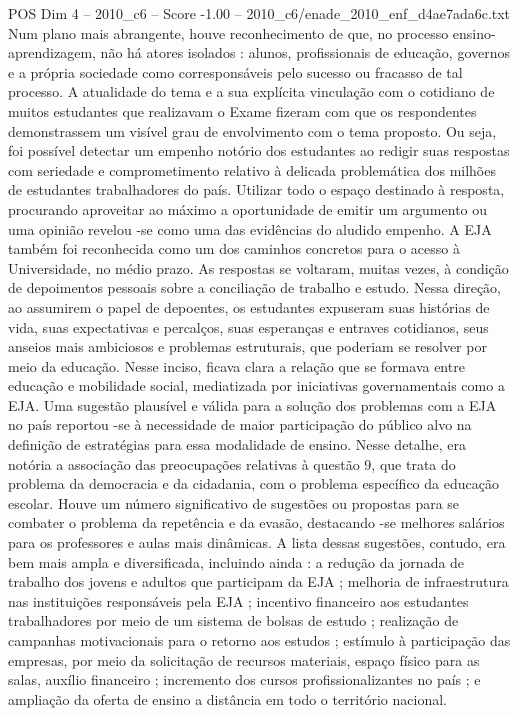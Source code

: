 \begin{textsample}{POS Dim 4 – 2010\_c6 – Score -1.00 – 2010\_c6/enade\_2010\_enf\_d4ae7ada6c.txt}
Num plano mais abrangente, houve reconhecimento de que, no processo ensino-aprendizagem, não há atores isolados : alunos, profissionais de educação, governos e a própria sociedade como corresponsáveis pelo sucesso ou fracasso de tal processo.
A atualidade do tema e a sua explícita vinculação com o cotidiano de muitos estudantes que realizavam o Exame fizeram com que os respondentes demonstrassem um visível grau de envolvimento com o tema proposto.
Ou seja, foi possível detectar um empenho notório dos estudantes ao redigir suas respostas com seriedade e comprometimento relativo à delicada problemática dos milhões de estudantes trabalhadores do país.
Utilizar todo o espaço destinado à resposta, procurando aproveitar ao máximo a oportunidade de emitir um argumento ou uma opinião revelou -se como uma das evidências do aludido empenho.
A EJA também foi reconhecida como um dos caminhos concretos para o acesso à Universidade, no médio prazo.
As respostas se voltaram, muitas vezes, à condição de depoimentos pessoais sobre a conciliação de trabalho e estudo.
Nessa direção, ao assumirem o papel de depoentes, os estudantes expuseram suas histórias de vida, suas expectativas e percalços, suas esperanças e entraves cotidianos, seus anseios mais ambiciosos e problemas estruturais, que poderiam se resolver por meio da educação.
Nesse inciso, ficava clara a relação que se formava entre educação e mobilidade social, mediatizada por iniciativas governamentais como a EJA.
Uma sugestão plausível e válida para a solução dos problemas com a EJA no país reportou -se à necessidade de maior participação do público alvo na definição de estratégias para essa modalidade de ensino.
Nesse detalhe, era notória a associação das preocupações relativas à questão 9, que trata do problema da democracia e da cidadania, com o problema específico da educação escolar.
Houve um número significativo de sugestões ou propostas para se combater o problema da repetência e da evasão, destacando -se melhores salários para os professores e aulas mais dinâmicas.
A lista dessas sugestões, contudo, era bem mais ampla e diversificada, incluindo ainda : a redução da jornada de trabalho dos jovens e adultos que participam da EJA ; melhoria de infraestrutura nas instituições responsáveis pela EJA ; incentivo financeiro aos estudantes trabalhadores por meio de um sistema de bolsas de estudo ; realização de campanhas motivacionais para o retorno aos estudos ; estímulo à participação das empresas, por meio da solicitação de recursos materiais, espaço físico para as salas, auxílio financeiro ; incremento dos cursos profissionalizantes no país ; e ampliação da oferta de ensino a distância em todo o território nacional.

\end{textsample}
